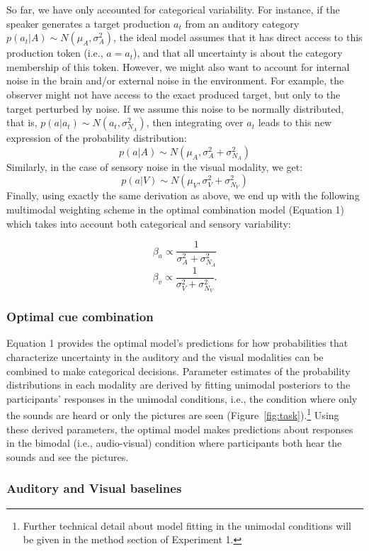 \documentclass[english,,man,floatsintext]{apa6}
\let\rmarkdownfootnote\footnote%
\def\footnote{\protect\rmarkdownfootnote}
\theoremstyle{definition}
\theoremstyle{definition}
\theoremstyle{definition}
\theoremstyle{remark}
\begin{document}
So far, we have only accounted for categorical variability. For
instance, if the speaker generates a target production \(a_t\) from an
auditory category \(p(a_t | A) \sim N(\mu_{A}, \sigma^2_{A})\), the
ideal model assumes that it has direct access to this production token
(i.e., \(a=a_t\)), and that all uncertainty is about the category
membership of this token. However, we might also want to account for
internal noise in the brain and/or external noise in the environment.
For example, the observer might not have access to the exact produced
target, but only to the target perturbed by noise. If we assume this
noise to be normally distributed, that is,
\(p(a | a_t) \sim N(a_t, \sigma^2_{N_A})\), then integrating over
\(a_t\) leads to this new expression of the probability distribution:
\[ p(a | A) \sim N(\mu_{A}, \sigma^2_{A}+\sigma^2_{N_A})\] Similarly, in
the case of sensory noise in the visual modality, we get:
\[ p(a | V) \sim N(\mu_{V}, \sigma^2_{V}+\sigma^2_{N_V})\] Finally,
using exactly the same derivation as above, we end up with the following
multimodal weighting scheme in the optimal combination model (Equation
1) which takes into account both categorical and sensory variability:

\[\beta_a \propto \frac{1}{\sigma^2_{A}+\sigma^2_{N_A}}\]
\[\beta_v \propto \frac{1}{\sigma^2_{V} +\sigma^2_{N_V}}.\]

\subsubsection{Optimal cue combination}\label{optimal-cue-combination}

Equation 1 provides the optimal model's predictions for how
probabilities that characterize uncertainty in the auditory and the
visual modalities can be combined to make categorical decisions.
Parameter estimates of the probability distributions in each modality
are derived by fitting unimodal posteriors to the participants'
responses in the unimodal conditions, i.e., the condition where only the
sounds are heard or only the pictures are seen
(Figure~\ref{fig:task}).\footnote{Further technical detail about model fitting in the unimodal conditions will be given in the method section of Experiment 1.}
Using these derived parameters, the optimal model makes predictions
about responses in the bimodal (i.e., audio-visual) condition where
participants both hear the sounds and see the pictures.

\subsubsection{Auditory and Visual
baselines}\label{auditory-and-visual-baselines}
\end{document}
